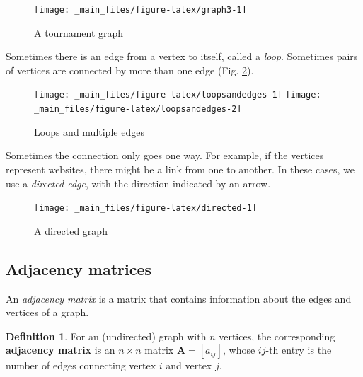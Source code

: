 \documentclass[
]{book}
\theoremstyle{definition}
\newtheorem{definition}{Definition}[chapter]
\theoremstyle{definition}
\theoremstyle{definition}
\theoremstyle{definition}
\theoremstyle{remark}
\begin{document}
\begin{figure}
\texttt{[image: \_main\_files/figure-latex/graph3-1]} \caption{A tournament graph}\label{fig:graph3}
\end{figure}

Sometimes there is an edge from a vertex to itself, called a \emph{loop}. Sometimes pairs of vertices are connected by more than one edge (Fig. \ref{fig:loopsandedges}).

\begin{figure}

{\centering \texttt{[image: \_main\_files/figure-latex/loopsandedges-1]} \texttt{[image: \_main\_files/figure-latex/loopsandedges-2]} 

}

\caption{Loops and multiple edges}\label{fig:loopsandedges}
\end{figure}

Sometimes the connection only goes one way. For example, if the vertices represent websites, there might be a link from one to another. In these cases, we use a \emph{directed edge}, with the direction indicated by an arrow.

\begin{figure}

{\centering \texttt{[image: \_main\_files/figure-latex/directed-1]} 

}

\caption{A directed graph}\label{fig:directed}
\end{figure}

\subsection*{Adjacency matrices}\label{adjacency-matrices}

An \emph{adjacency matrix} is a matrix that contains information about the edges and vertices of a graph.

\begin{defbox}

\begin{definition}
For an (undirected) graph with \(n\) vertices, the corresponding \textbf{adjacency matrix} is an \(n\times n\) matrix \(\mathbf{A}=[a_{ij}]\), whose \(ij\)-th entry is the number of edges connecting vertex \(i\) and vertex \(j\).
\end{definition}

\end{defbox}
\end{document}
